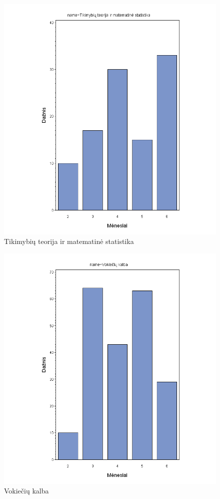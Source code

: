 \begin{figure}[htb]
\includegraphics[width=0.9\linewidth]{images/months/Tikimybiu_teorija_ir_matematine_statistika.png}
\caption{Tikimybių teorija ir matematinė statistika}
\label{fig:statistika}
\end{figure}


\begin{figure}[htb]
\includegraphics[width=0.9\linewidth]{images/months/Vokieciu_kalba.png}
\caption{Vokiečių kalba}
\label{fig:vokieciu}
\end{figure} 